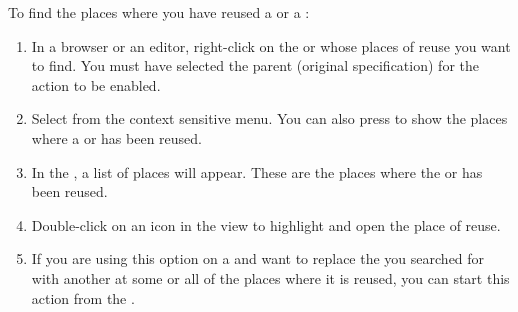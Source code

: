 
To find the places where you have reused a \gdcase{} or a \gdsuite{}:
\begin{enumerate}
\item  In a browser or an editor, right-click on the \gdcase{} or \gdsuite{} whose places of reuse  you want to find. You must have selected the parent (original specification) for the action to be enabled.
\item Select  from the context sensitive menu. You can also press  to show the places where a \gdcase{} or \gdsuite{} has been reused.
\item In the  , a list of places will appear. These are the places where the \gdcase{} or \gdsuite{} has been reused. 
\item Double-click on an icon in the view to highlight and open the place of reuse.
\item  If you are using this option on a \gdcase{} and want to replace the \gdcase{} you searched for with another \gdcase{} at some or all of the places where it is reused, you can start this action from the  \gdsearchresultview{} .
\end{enumerate}
